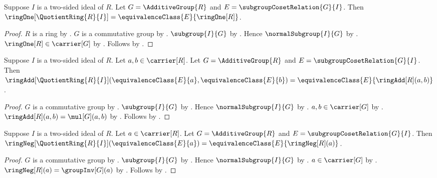 \begin{proposition}\label{quotient_ring_one}
    Suppose $I$ is a two-sided ideal of $R$.
    Let $G=\AdditiveGroup{R}$ and $E=\subgroupCosetRelation{G}{I}$.
    Then $\ringOne[\QuotientRing{R}{I}]
        =\equivalenceClass{E}{\ringOne[R]}$.
\end{proposition}
\begin{proof}
    $R$ is a ring by .
    $G$ is a commutative group by
        .
    $\subgroup{I}{G}$ by
        .
    Hence $\normalSubgroup{I}{G}$ by
        .
    $\ringOne[R]\in\carrier[G]$ by
        .
    Follows by
        .
\end{proof}

\begin{proposition}\label{quotient_ring_add_apply}
    Suppose $I$ is a two-sided ideal of $R$.
    Let $a,b\in\carrier[R]$.
    Let $G=\AdditiveGroup{R}$ and $E=\subgroupCosetRelation{G}{I}$.
    Then
        $\ringAdd[\QuotientRing{R}{I}]
            (\equivalenceClass{E}{a},\equivalenceClass{E}{b})
        =\equivalenceClass{E}{\ringAdd[R](a,b)}$.
\end{proposition}
\begin{proof}
    $G$ is a commutative group by
        .
    $\subgroup{I}{G}$ by
        .
    Hence $\normalSubgroup{I}{G}$ by
        .
    $a,b\in\carrier[G]$ by .
    $\ringAdd[R](a,b)=\mul[G](a,b)$ by
        .
    Follows by
        .
\end{proof}

\begin{proposition}\label{quotient_ring_neg_apply}
    Suppose $I$ is a two-sided ideal of $R$.
    Let $a\in\carrier[R]$.
    Let $G=\AdditiveGroup{R}$ and $E=\subgroupCosetRelation{G}{I}$.
    Then
        $\ringNeg[\QuotientRing{R}{I}](\equivalenceClass{E}{a})
        =\equivalenceClass{E}{\ringNeg[R](a)}$.
\end{proposition}
\begin{proof}
    $G$ is a commutative group by
        .
    $\subgroup{I}{G}$ by
        .
    Hence $\normalSubgroup{I}{G}$ by
        .
    $a\in\carrier[G]$ by .
    $\ringNeg[R](a)=\groupInv[G](a)$ by
        .
    Follows by
        .
\end{proof}

